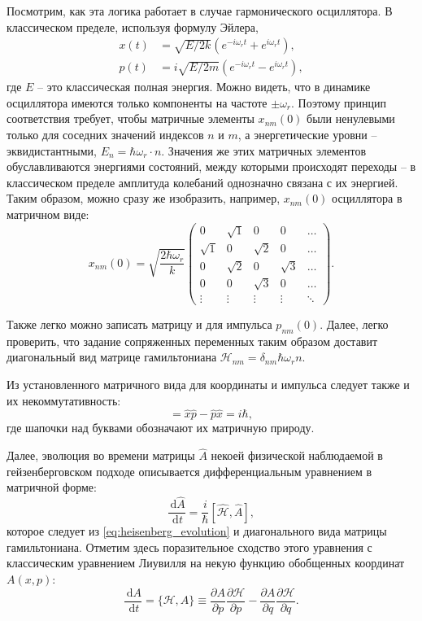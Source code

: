 \documentclass[14pt, a4paper]{extreport}
\newcommand{\diff}{\,\mathrm{d}}
\numberwithin{equation}{section}
\begin{document}
Посмотрим, как эта логика работает в случае гармонического осциллятора. В классическом пределе, используя формулу Эйлера,
\begin{align}
	x(t) &= \sqrt{E/2k} (e^{-i\omega_r t} + e^{i\omega_r t}),\\
	p(t) &= i\sqrt{E/2m} (e^{-i\omega_r t} - e^{i\omega_r t}),
\end{align}
где $ E $ -- это классическая полная энергия. Можно видеть, что в динамике осциллятора имеются только компоненты на частоте $\pm \omega_r$. Поэтому принцип соответствия требует, чтобы матричные элементы $x_{nm}(0)$ были ненулевыми только для соседних значений индексов $n$ и $m$, а энергетические уровни -- эквидистантными, $E_n = \hbar \omega_r \cdot n$. Значения же этих матричных элементов обуславливаются энергиями состояний, между которыми происходят переходы -- в классическом пределе амплитуда колебаний однозначно связана с их энергией. Таким образом, можно сразу же изобразить, например, $x_{nm}(0)$ осциллятора в матричном виде:
\begin{equation}
	x_{nm}(0) = \sqrt{\frac{2\hbar \omega_r}{k}}\left(	\begin{matrix}
	0 & \sqrt{1} & 0 & 0&  \dots \\
	\sqrt{1} & 0 &\sqrt{2} & 0& \dots \\
	0 & \sqrt{2} & 0 & \sqrt{3} &  \dots\\
	0 & 0 & \sqrt{3} & 0 & \dots \\
	\vdots & \vdots & \vdots & \vdots  & \ddots
	\end{matrix}\right).
\end{equation}

Также легко можно записать матрицу и для импульса $p_{nm}(0)$. Далее, легко проверить, что задание сопряженных переменных таким образом доставит диагональный вид матрице гамильтониана $\mathcal{H}_{nm} = \delta_{nm} \hbar \omega_r n $.

Из установленного матричного вида для координаты и импульса следует также и их некоммутативность:
\begin{equation}
	[\hat x, \hat p] = \hat x \hat p - \hat p \hat x = i\hbar,
\end{equation}
где шапочки над буквами обозначают их матричную природу.

Далее, эволюция во времени матрицы $\hat A$ некоей физической наблюдаемой в гейзенберговском подходе описывается дифференциальным уравнением в матричной форме:
\begin{equation}
	\frac{\diff \hat A}{\diff t} = \frac{i}{\hbar} [\hat{\mathcal{H}}, \hat A], \label{eq:heisenberg_picture}
\end{equation}
которое следует из \eqref{eq:heisenberg_evolution} и диагонального вида матрицы гамильтониана. Отметим здесь поразительное сходство этого уравнения с классическим уравнением Лиувилля на некую функцию обобщенных координат $ A(x, p) $:
\begin{equation}
	\frac{\diff A}{\diff t} = \{\mathcal{H}, A\} \equiv \frac{\partial A}{\partial p} \frac{\partial \mathcal{H}}{\partial p} -  \frac{\partial A}{\partial q}\frac{\partial \mathcal{H}}{\partial q}.
\end{equation}
\end{document}
